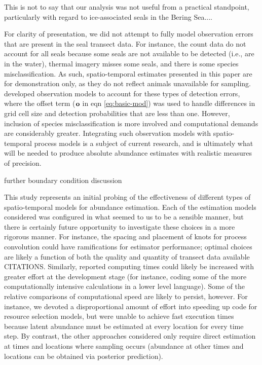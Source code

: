 \documentclass[times,mee,doublespace,]{besauth2}
\begin{document}
This is not to say that our analysis was not useful from a practical standpoint, particularly with regard to ice-associated seals in the Bering Sea....

For clarity of presentation, we did not attempt to fully model observation errors that are present in the seal transect data.  For instance, the count data do not account for all seals because some seals are not available to be detected (i.e., are in the water), thermal imagery misses some seals, and there is some species misclassification. As such, spatio-temporal estimates presented in this paper are for demonstration only, as they do not reflect animals unavailable for sampling. \citet{ConnEtAl2014} developed observation models to account for these types of detection errors, where the offset term (${\bf o}$ in eqn \ref{eq:basic-mod}) was used to handle differences in grid cell size and detection probabilities that are less than one.  However, inclusion of species misclassification is more involved and computational demands are considerably greater.  Integrating such observation models with spatio-temporal process models is a subject of current research, and is ultimately what will be needed to produce absolute abundance estimates with realistic measures of precision.

further boundary condition discussion

This study represents an initial probing of the effectiveness of different types of spatio-temporal models for abundance estimation.  Each of the estimation models considered was configured in what seemed to us to be a sensible manner, but there is certainly future opportunity to investigate these choices in a more rigorous manner.  For instance, the spacing and placement of knots for process convolution could have ramifications for estimator performance; optimal choices are likely a function of both the quality and quantity of transect data available CITATIONS.  Similarly, reported computing times could likely be increased with greater effort at the development stage (for instance, coding some of the more computationally intensive calculations in a lower level language).  Some of the relative comparisons of computational speed are likely to persist, however. For instance, we devoted a disproportional amount of effort into speeding up code for resource selection models, but were unable to achieve fast execution times because latent abundance must be estimated at every location for every time step.  By contrast, the other approaches considered only require direct estimation at times and locations where sampling occurs (abundance at other times and locations can be obtained via posterior prediction).
\end{document}
